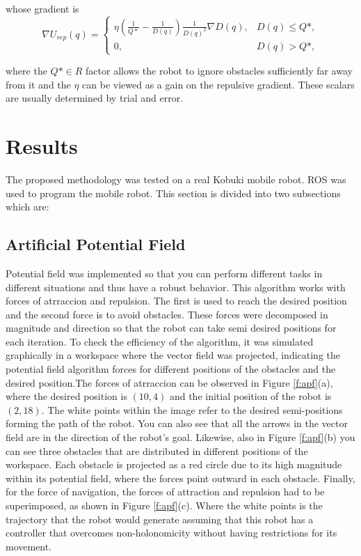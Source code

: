\documentclass[conference]{IEEEtran}
\begin{document}
whose gradient is
\begin{equation}
	\nabla U_{rep}(q) = 
		\begin{cases}
			\eta (\frac{1}{Q*} - \frac{1}{D(q)})\frac{1}{D(q)^2} \nabla D(q), &D(q) \leq Q*,\\
			0 , &D(q) > Q*,
		\end{cases}
	\label{eq:force_rep}
\end{equation}

where the $Q* \in R $ factor allows the robot to ignore obstacles sufficiently far away from it and the $\eta$ can be viewed as a gain on the repulsive gradient. These scalars are usually determined by trial and error.


\section{Results}
The proposed methodology was tested on a real Kobuki mobile robot. ROS was used to program the mobile robot. This section is divided into two subsections which are:

\subsection{Artificial Potential Field}

Potential field was implemented so that you can perform different tasks in different situations and thus have a robust behavior. This algorithm works with forces of atrraccion and repulsion. The first is used to reach the desired position and the second force is to avoid obstacles. These forces were decomposed in magnitude and direction so that the robot can take semi desired positions for each iteration.
To check the efficiency of the algorithm, it was simulated graphically in a workspace where the vector field was projected, indicating the potential field algorithm forces for different positions of the obstacles and the desired position.The forces of atrraccion can be observed in Figure \ref{f:apf}(a), where the desired position is $ (10,4) $ and the initial position of the robot is $ (2,18) $. The white points within the image refer to the desired semi-positions forming the path of the robot. You can also see that all the arrows in the vector field are in the direction of the robot's goal. Likewise, also in Figure \ref{f:apf}(b) you can see three obstacles that are distributed in different positions of the workspace. Each obstacle is projected as a red circle due to its high magnitude within its potential field, where the forces point outward in each obstacle. Finally, for the force of navigation, the forces of attraction and repulsion had to be superimposed, as shown in Figure \ref{f:apf}(c). Where the white points is the trajectory that the robot would generate assuming that this robot has a controller that overcomes non-holonomicity without having restrictions for its movement.
\end{document}
